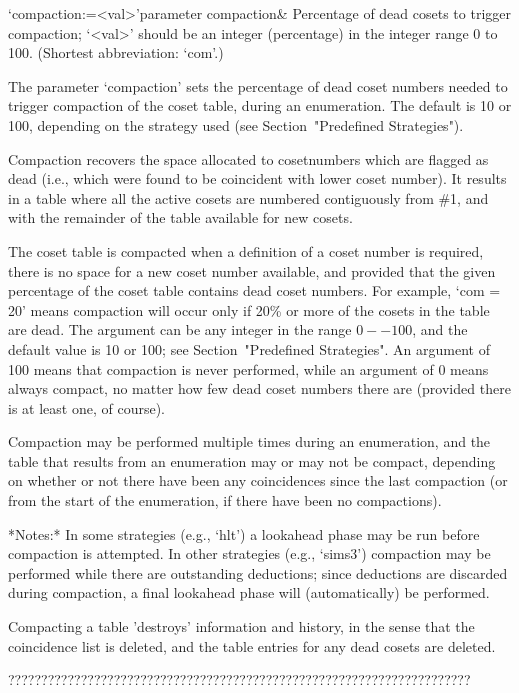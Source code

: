\>`compaction:=<val>'{parameter compaction}&
Percentage of dead cosets to trigger compaction;
`<val>' should be an integer (percentage) in the integer range 0 to 100.
(Shortest abbreviation: `com'.)

The parameter  `compaction' sets the percentage of  dead coset numbers
needed  to   trigger  compaction  of   the  coset  table,   during  an
enumeration.  The default is 10 or 100, depending on the strategy used
(see Section~"Predefined Strategies").

Compaction  recovers the  space  allocated to  cosetnumbers which  are
flagged  as  dead  (i.e.,  which  were found  to  be  coincident  with
lower  coset number).   It results in  a table where all  the active
cosets are numbered  contiguously from \#1, and with  the remainder of
the table available for new cosets.


The coset  table is compacted when  a definition of a  coset number is
required,  there is no  space for  a new  coset number  available, and
provided that  the given percentage  of the coset table  contains dead
coset numbers.   For example, `com  = 20' means compaction  will occur
only  if 20\%  or  more of  the cosets  in  the table  are dead.   The
argument can  be any  integer in the  range $0--100$, and  the default
value is 10 or  100; see Section~"Predefined Strategies".  An argument
of 100 means that compaction  is never performed, while an argument of
0 means always compact, no matter how few dead coset numbers there are
(provided there is at least one, of course).

Compaction may be performed  multiple times during an enumeration, and
the table that results from an  enumeration may or may not be compact,
depending on whether or not there have been any coincidences since the
last compaction (or  from the start of the  enumeration, if there have
been no compactions).

*Notes:*
In some strategies  (e.g., `hlt') a lookahead phase  may be run before
compaction  is   attempted.   In  other   strategies  (e.g.,  `sims3')
compaction may  be performed  while there are  outstanding deductions;
since deductions  are discarded  during compaction, a  final lookahead
phase will (automatically) be performed.

Compacting a  table 'destroys' information  and history, in  the sense
that the  coincidence list is deleted,  and the table  entries for any
dead cosets are deleted.

??????????????????????????????????????????????????????????????????????

